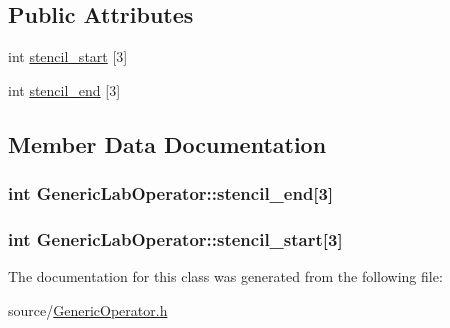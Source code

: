 \subsection*{Public Attributes}
\begin{DoxyCompactItemize}
\item 
int \hyperlink{class_generic_lab_operator_a007ab6ad6deb024d839d1d03241672c0}{stencil\+\_\+start} \mbox{[}3\mbox{]}
\item 
int \hyperlink{class_generic_lab_operator_a4daf37ba8c5a018f2b779d8636aba63f}{stencil\+\_\+end} \mbox{[}3\mbox{]}
\end{DoxyCompactItemize}


\subsection{Member Data Documentation}
\hypertarget{class_generic_lab_operator_a4daf37ba8c5a018f2b779d8636aba63f}{}
\subsubsection[{stencil\+\_\+end}]{\setlength{\rightskip}{0pt plus 5cm}int Generic\+Lab\+Operator\+::stencil\+\_\+end\mbox{[}3\mbox{]}}\label{class_generic_lab_operator_a4daf37ba8c5a018f2b779d8636aba63f}
\hypertarget{class_generic_lab_operator_a007ab6ad6deb024d839d1d03241672c0}{}
\subsubsection[{stencil\+\_\+start}]{\setlength{\rightskip}{0pt plus 5cm}int Generic\+Lab\+Operator\+::stencil\+\_\+start\mbox{[}3\mbox{]}}\label{class_generic_lab_operator_a007ab6ad6deb024d839d1d03241672c0}


The documentation for this class was generated from the following file\+:\begin{DoxyCompactItemize}
\item 
source/\hyperlink{_generic_operator_8h}{Generic\+Operator.\+h}\end{DoxyCompactItemize}
